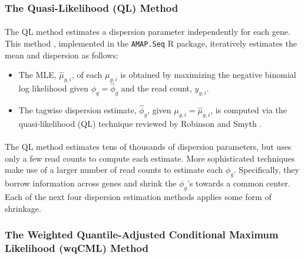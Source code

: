 \documentclass[10pt]{article}
\providecommand{\wh}[1]{\widehat{#1}}
\begin{document}
\subsubsection*{The Quasi-Likelihood (QL) Method} \label{subsec:amap}

\paragraph{} \indent The QL method estimates a dispersion parameter independently for each gene. This method \cite{amap_m} \cite{amap}, implemented in the {\tt AMAP.Seq} R package, iteratively estimates the mean and dispersion as follows:

\begin{itemize}
\item The MLE, $\wh{\mu}_{g, i}$, of each $\mu_{g, i}$ is obtained by maximizing the negative binomial log likelihood given $\phi_g = \wh{\phi}_g$ and the read count, $y_{g, i}$.
\item The tagwise dispersion estimate, $\wh{\phi}_g$, given $\mu_{g, i} = \wh{\mu}_{g, i}$, is computed via the quasi-likelihood (QL) technique reviewed by Robinson and Smyth \cite{rs08}.
\end{itemize}

\paragraph{} \indent The QL method estimates tens of thousands of dispersion parameters, but uses only a few read counts to compute each estimate. More sophisticated techniques make use of a larger number of read counts to estimate each $\phi_g$. Specifically, they borrow information across genes and shrink %
the $\phi_g$'s towards a common center. Each of the next four dispersion estimation methods applies some form of shrinkage.


\subsubsection*{The Weighted Quantile-Adjusted Conditional Maximum Likelihood (wqCML) Method} \label{subsec:qcml}
\end{document}
